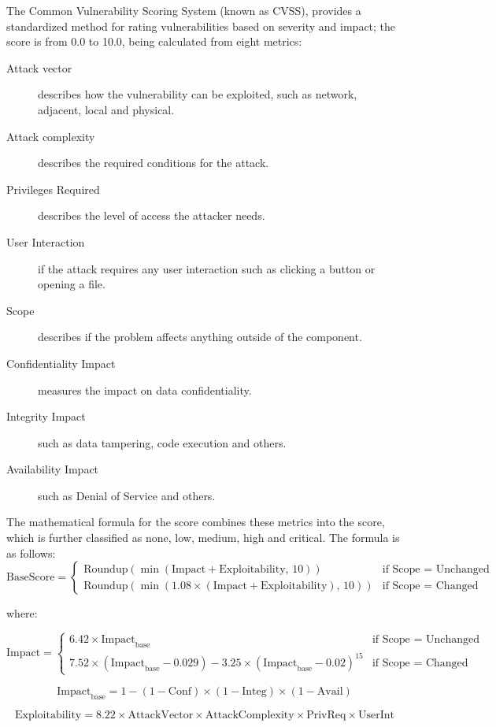 The Common Vulnerability Scoring System (known as CVSS), provides a standardized method for rating vulnerabilities based on severity and impact; the score is from 0.0 to 10.0, being calculated from eight metrics:
\begin{description}
	\item[Attack vector] describes how the vulnerability can be exploited, such as network, adjacent, local and physical.
	\item[Attack complexity] describes the required conditions for the attack.
	\item[Privileges Required] describes the level of access the attacker needs.
	\item[User Interaction] if the attack requires any user interaction such as clicking a button or opening a file.
	\item[Scope] describes if the problem affects anything outside of the component.
	\item[Confidentiality Impact] measures the impact on data confidentiality.
	\item[Integrity Impact] such as data tampering, code execution and others.
	\item[Availability Impact] such as Denial of Service and others.
\end{description}

The mathematical formula for the score combines these metrics into the score, which is further classified as none, low, medium, high and critical. The formula is as follows:
$$
\text{BaseScore} =
\begin{cases}
\text{Roundup}(\min(\text{Impact} + \text{Exploitability},\, 10)) & \text{if Scope = Unchanged} \\
\text{Roundup}(\min(1.08 \times (\text{Impact} + \text{Exploitability}),\, 10)) & \text{if Scope = Changed}
\end{cases}
$$

where:

$$
\text{Impact} =
\begin{cases}
6.42 \times \text{Impact}_{\text{base}} & \text{if Scope = Unchanged} \\
7.52 \times (\text{Impact}_{\text{base}} - 0.029) - 3.25 \times (\text{Impact}_{\text{base}} - 0.02)^{15} & \text{if Scope = Changed}
\end{cases}
$$

$$
\text{Impact}_{\text{base}} = 1 - (1 - \text{Conf}) \times (1 - \text{Integ}) \times (1 - \text{Avail})
$$

$$
\text{Exploitability} = 8.22 \times \text{AttackVector} \times \text{AttackComplexity} \times \text{PrivReq} \times \text{UserInt}
$$

